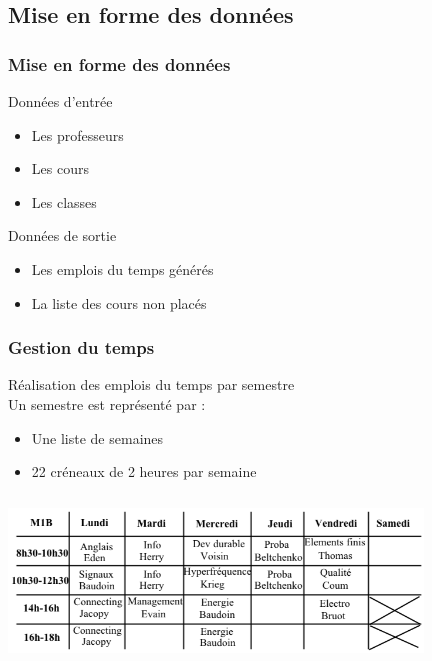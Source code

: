 \documentclass{beamer}
\begin{document}
\subsection{Mise en forme des données}
\begin{frame}
\frametitle{Mise en forme des données}
\begin{block}{Données d'entrée}
\begin{itemize}
\item Les professeurs
\item Les cours
\item Les classes
\end{itemize}
\end{block}
\vspace{\baselineskip}
\begin{block}{Données de sortie}
\begin{itemize}
\item Les emplois du temps générés
\item La liste des cours non placés
\end{itemize}
\end{block}
\end{frame}

\begin{frame}
\frametitle{Gestion du temps}
Réalisation des emplois du temps par semestre\\
\vspace{\baselineskip}
Un semestre est représenté par :
\begin{itemize}
\item Une liste de semaines
\item 22 créneaux de 2 heures par semaine
\end{itemize}
\end{frame}

\begin{frame}
\begin{center}
\includegraphics [width=110mm, height=45mm]{Dessin2.png}
\end{center}
\end{frame}
\end{document}
